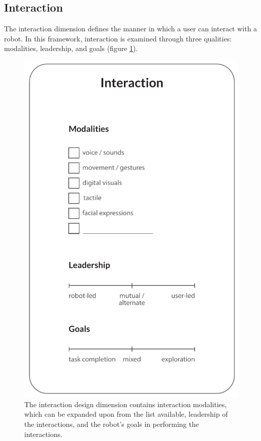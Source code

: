 \subsection{Interaction}

\label{chapter:interaction}

The interaction dimension defines the manner in which a user can interact with a robot. In this framework, interaction is examined through three qualities: modalities, leadership, and goals (figure \ref{fig:interaction}). 

\begin{figure}
\centering
  \includegraphics[scale=0.75]{images/solution_v4-04.pdf}
  \caption{The interaction design dimension contains interaction modalities, which can be expanded upon from the list available, leadership of the interactions, and the robot's goals in performing the interactions.}
  \label{fig:interaction}
\end{figure}

